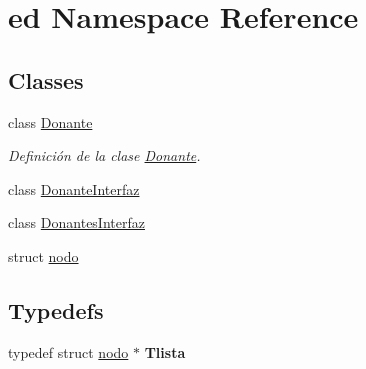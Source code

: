 \hypertarget{namespaceed}{}\section{ed Namespace Reference}
\label{namespaceed}
\subsection*{Classes}
\begin{DoxyCompactItemize}
\item 
class \hyperlink{classed_1_1Donante}{Donante}
\begin{DoxyCompactList}\small\item\em Definición de la clase \hyperlink{classed_1_1Donante}{Donante}. \end{DoxyCompactList}\item 
class \hyperlink{classed_1_1DonanteInterfaz}{Donante\+Interfaz}
\item 
class \hyperlink{classed_1_1DonantesInterfaz}{Donantes\+Interfaz}
\item 
struct \hyperlink{structed_1_1nodo}{nodo}
\end{DoxyCompactItemize}
\subsection*{Typedefs}
\begin{DoxyCompactItemize}
\item 
\hypertarget{namespaceed_ab448c11aaf2782c1e95470f960f3341e}{}typedef struct \hyperlink{structed_1_1nodo}{nodo} $\ast$ {\bfseries Tlista}\label{namespaceed_ab448c11aaf2782c1e95470f960f3341e}

\end{DoxyCompactItemize}
